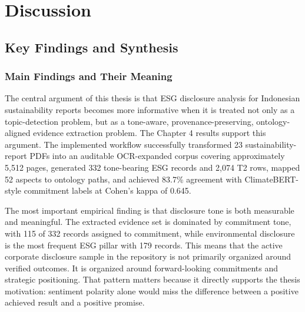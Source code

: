 \documentclass[english, online, cse, master]{dithesis}
\begin{document}
 
\chapter{Discussion}
  \label{discussion}
  



































\section{Key Findings and Synthesis}

\subsection{Main Findings and Their Meaning}

The central argument of this thesis is that ESG disclosure analysis for Indonesian sustainability reports becomes more informative when it is treated not only as a topic-detection problem, but as a tone-aware, provenance-preserving, ontology-aligned evidence extraction problem. The Chapter 4 results support this argument. The implemented workflow successfully transformed 23 sustainability-report PDFs into an auditable OCR-expanded corpus covering approximately 5,512 pages, generated 332 tone-bearing ESG records and 2,074 T2 rows, mapped 52 aspects to ontology paths, and achieved 83.7\% agreement with ClimateBERT-style commitment labels at Cohen’s kappa of 0.645.

The most important empirical finding is that disclosure tone is both measurable and meaningful. The extracted evidence set is dominated by commitment tone, with 115 of 332 records assigned to commitment, while environmental disclosure is the most frequent ESG pillar with 179 records. This means that the active corporate disclosure sample in the repository is not primarily organized around verified outcomes. It is organized around forward-looking commitments and strategic positioning. That pattern matters because it directly supports the thesis motivation: sentiment polarity alone would miss the difference between a positive achieved result and a positive promise.
\end{document}
